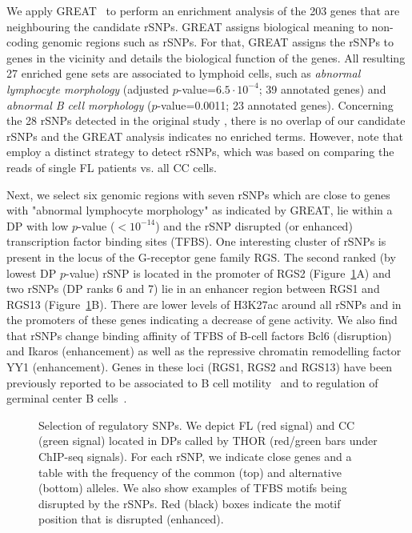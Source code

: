 We apply GREAT~\citep{McLean2010} to perform an enrichment analysis of the 203 genes that are neighbouring the candidate rSNPs.
GREAT assigns biological meaning to non-coding genomic regions such as rSNPs.
For that, GREAT assigns the rSNPs to genes in the vicinity and details the biological function of the genes.
All resulting 27 enriched gene sets are associated to lymphoid cells, such as \textit{abnormal lymphocyte morphology} (adjusted $p$-value=$6.5 \cdot 10^{-4}$; 39 annotated genes) and \textit{abnormal B cell morphology} ($p$-value=0.0011; 23 annotated genes).
Concerning the 28 rSNPs detected in the original study \citep{Koues2015}, there is no overlap of our candidate rSNPs and the GREAT analysis indicates no enriched terms. 
However, note that \cite{Koues2015} employ a distinct strategy to detect rSNPs, which was based on comparing the reads of single FL patients vs. all CC cells.

Next, we select six genomic regions with seven rSNPs which are close to genes with "abnormal lymphocyte morphology" as indicated by GREAT, lie within a DP with low $p$-value ($< 10^{-14}$) and the rSNP disrupted (or enhanced) transcription factor binding sites (TFBS). 
One interesting cluster of rSNPs is present in the locus of the G-receptor gene family RGS. 
The second ranked (by lowest DP $p$-value) rSNP is located in the promoter of RGS2 (Figure~\ref{fig_rsnps}A) and two rSNPs (DP ranks 6 and 7) lie in an enhancer region between RGS1 and RGS13 (Figure~\ref{fig_rsnps}B). 
There are lower levels of H3K27ac around all rSNPs and in the promoters of these genes indicating a decrease of gene activity. 
We also find that rSNPs change binding affinity of TFBS of B-cell factors Bcl6 (disruption) and Ikaros (enhancement) as well as the repressive chromatin remodelling factor YY1 (enhancement). 
Genes in these loci (RGS1, RGS2 and RGS13) have been previously reported to  be associated to B cell motility~\citep{Han2005} and to regulation of germinal center B cells~\citep{Shi2002}.

\begin{figure}[h]
\begin{center}
\end{center}
\caption[Selection of regulatory SNPs]{Selection of regulatory SNPs. We depict FL (red signal) and CC (green signal) located in DPs called by THOR (red/green bars under ChIP-seq signals). For each rSNP, we indicate close genes and a table with the frequency of the common (top) and alternative (bottom) alleles. We also show examples of TFBS motifs being disrupted by the rSNPs. Red (black) boxes indicate the motif position that is disrupted (enhanced).}
\label{fig_rsnps}
\end{figure}

